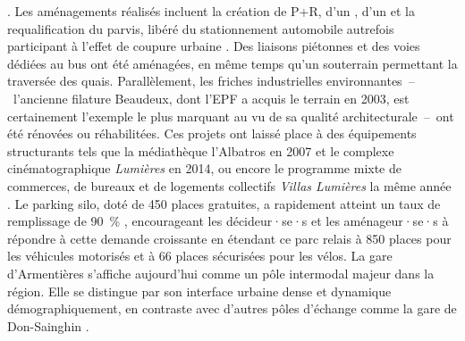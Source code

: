 \begin{refsegment}
{}. Les aménagements réalisés incluent la création de \acrfull{P+R}, d’un , d’un  et la requalification du parvis, libéré du stationnement automobile autrefois participant à l'effet de coupure urbaine \textcolor{blue}{\autocite[53]{christiansen_case_2012}}. Des liaisons piétonnes et des voies dédiées au bus ont été aménagées, en même temps qu'un souterrain permettant la traversée des quais. Parallèlement, les friches industrielles environnantes~–~l'ancienne filature Beaudeux, dont l'\acrfull{EPF} a acquis le terrain en 2003, est certainement l'exemple le plus marquant au vu de sa qualité architecturale~–~ont été rénovées ou réhabilitées. Ces projets ont laissé place à des équipements structurants tels que la médiathèque l'Albatros en 2007 et le complexe cinématographique \textsl{Lumières} en 2014, ou encore le programme mixte de commerces, de bureaux et de logements collectifs \textsl{Villas Lumières} la même année \textcolor{blue}{\autocites[5]{richer_reamenagement_2013}[125, 129]{liu_transport_2014}}. Le parking silo, doté de 450 places gratuites, a rapidement atteint un taux de remplissage de 90~\% \textcolor{blue}{\autocite[53]{christiansen_case_2012}}, encourageant les décideur·se·s et les aménageur·se·s à répondre à cette demande croissante en étendant ce parc relais à 850 places pour les véhicules motorisés et à 66 places sécurisées pour les vélos. La gare d'Armentières s'affiche aujourd'hui comme un pôle intermodal majeur dans la région. Elle se distingue par son interface urbaine dense et dynamique démographiquement, en contraste avec d’autres pôles d’échange comme la gare de Don-Sainghin \textcolor{blue}{\autocite[93]{schmitt_marches_2020}}.%


\end{refsegment}
